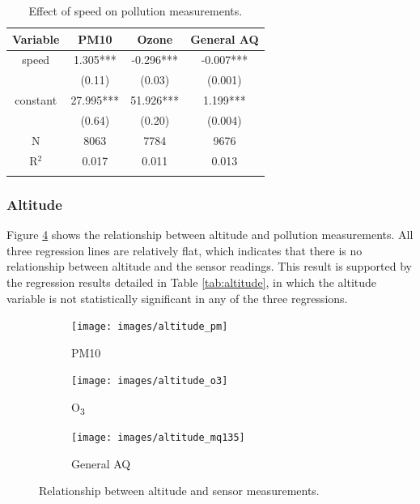 \documentclass[11pt]{report}
\begin{document}
\begin{table}[!tb]
\centering
\caption{Effect of speed on pollution measurements.}
\label{tab:speed}
\begin{tabular}{c c c c}
\toprule
Variable & PM10 & Ozone & General AQ \\ 
\midrule
speed	& 1.305***		& -0.296***	& -0.007*** \\
		& (0.11)		& (0.03)		& (0.001)   \\
constant	& 27.995***	& 51.926***	& 1.199*** \\
		& (0.64)		& (0.20)		& (0.004)   \\ \midrule
 N		& 8063 		& 7784   		& 9676   	\\          
R$^{2}$	& 0.017   		& 0.011		& 0.013   	\\
\bottomrule
\addlinespace[1ex]
\multicolumn{4}{l}{\textsuperscript{***}$p<0.01$, 
  \textsuperscript{**}$p<0.05$, 
  \textsuperscript{*}$p<0.1$}
\end{tabular}
\end{table}

\subsubsection{Altitude}

Figure \ref{fig:altitude} shows the relationship between altitude and pollution measurements. All three regression lines are relatively flat, which indicates that there is no relationship between altitude and the sensor readings. This result is supported by the regression results detailed in Table \ref{tab:altitude}, in which the altitude variable is not statistically significant in any of the three regressions.

\begin{figure}[!tb]
    \centering
    \begin{minipage}{1\linewidth}
            \begin{subfigure}[t]{.32\linewidth}
                \texttt{[image: images/altitude\_pm]}
                \caption{PM10}
                \label{fig:altitude_pm}
            \end{subfigure}
            \begin{subfigure}[t]{.32\linewidth}
            	\texttt{[image: images/altitude\_o3]}
            	\caption{O\textsubscript{3}}
            	\label{fig:altitude_o3}
	        \end{subfigure}
            \begin{subfigure}[t]{.32\linewidth}
                \texttt{[image: images/altitude\_mq135]}
                \caption{General AQ}
                \label{fig:altitude_mq135}
            \end{subfigure}
        \end{minipage}
    \caption[Relationship between altitude and sensor measurements.]{Relationship between altitude and sensor measurements.}
    \label{fig:altitude}
\end{figure}
\end{document}
